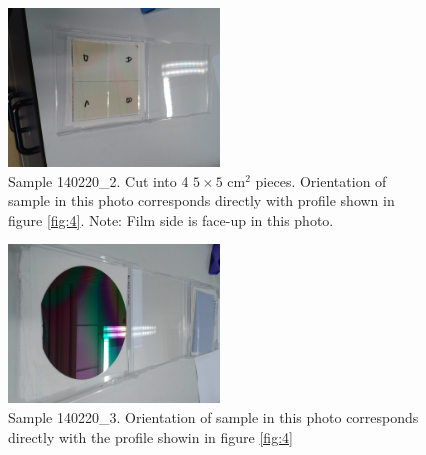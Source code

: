 \documentclass{article}
\begin{document}
\begin{figure}[h]
    \centering
        \includegraphics[width = 0.5\textwidth]{140220_2_rotate.jpg}
    \caption{Sample 140220\_2. Cut into 4 $5\times5$ cm$^2$ pieces. Orientation of sample in this photo corresponds directly with profile shown in figure \ref{fig:4}. Note: Film side is face-up in this photo.  }
\end{figure}

\begin{figure}[h]
    \centering
        \includegraphics[width = 0.5\textwidth]{140220_3_rotate.jpg}
    \caption{Sample 140220\_3. Orientation of sample in this photo corresponds directly with the profile showin in figure \ref{fig:4}}
\end{figure}
\end{document}
